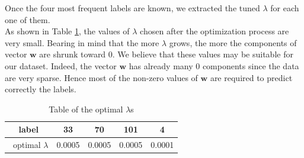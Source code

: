 \documentclass{article}
\begin{document}
\noindent Once the four most frequent labels are known, we extracted the tuned $\lambda$ for each one of them.\\
As shown in Table \ref{table lambda}, the values of $\lambda$ chosen after the optimization process are very small. Bearing in mind that the more $\lambda$ grows, the more the components of vector $\textbf{w}$ are shrunk toward 0. We believe that these values may be suitable for our dataset. Indeed, the vector $\textbf{w}$ has already many 0 components since the data are very sparse. Hence most of the non-zero values of $\textbf{w}$ are required to predict correctly the labels.
\begin{table}[h]
\begin{center}
 \begin{tabular}{||c | c |  c | c| c||} 
 \hline label & 33 & 70 & 101 & 4 \\ [0.5ex] 
    \hline\
   optimal $\lambda$ & 0.0005 & 0.0005  & 0.0005  & 0.0001  \\
 \hline 
\end{tabular}
\caption{Table of the optimal $\lambda$s}
\label{table lambda}
\end{center}
\end{table}
\end{document}
